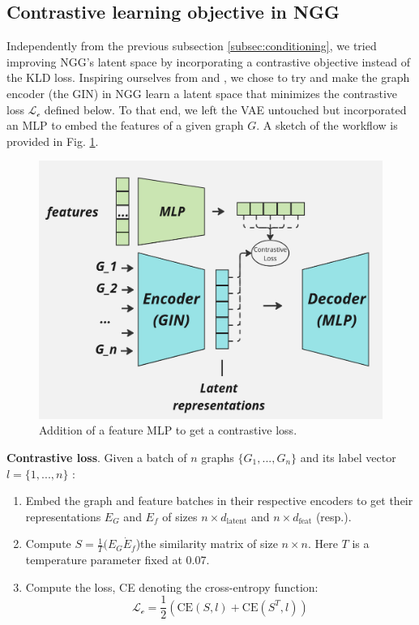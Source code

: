 \documentclass[10pt,twocolumn,letterpaper]{article}
\begin{document}
\subsection{Contrastive learning objective in NGG}
\label{subsec:CLIP}
Independently from the previous subsection \ref{subsec:conditioning}, we tried improving NGG's latent space by incorporating a contrastive objective instead of the KLD loss. Inspiring ourselves from \cite{CLIP} and \cite{graphCLIP}, we chose to try and make the graph encoder (the GIN) in NGG learn a latent space that minimizes the contrastive loss $\mathcal{L_\text{c}}$ defined below. To that end, we left the VAE untouched but incorporated an MLP to embed the features of a given graph $G$. A sketch of the workflow is provided in Fig. \ref{fig:CLIP}.

\begin{figure}[h]
    \centering
    \includegraphics[width=.8\linewidth]{figures/CLIP.jpg}
    \caption{Addition of a feature MLP to get a contrastive loss.}
    \label{fig:CLIP}
\end{figure}

\noindent
\textbf{Contrastive loss}. Given a batch of $n$ graphs $\{G_1, ..., G_n\}$ and its label vector $l = \{1, ..., n\}$ :
\begin{enumerate}
    \item Embed the graph and feature batches in their respective encoders to get their representations $E_G$ and $E_f$ of sizes $n \times d_{\text{latent}}$ and $n \times d_{\text{feat}}$ (resp.).
    \item Compute $S = \frac{1}{T}(E_G \dot E_f$)the similarity matrix of size $n \times n$. Here $T$ is a temperature parameter fixed at 0.07.
    \item Compute the loss, CE denoting the cross-entropy function:\begin{equation}
    \mathcal{L_\text{c}} = \frac{1}{2}(\text{CE}(S, l) + \text{CE}(S^{T}, l))
\end{equation}
\end{enumerate}
\end{document}
